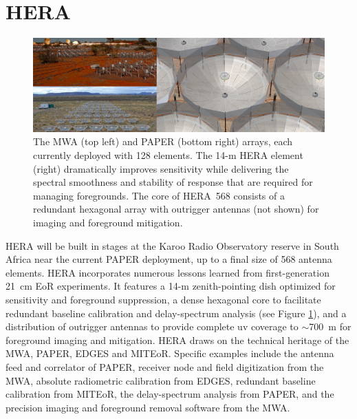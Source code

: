 \documentclass[preprint]{aastex}
\begin{document}
\vspace{-0.25in}
\section{HERA}
\label{PDsec}
\begin{figure}[t]\centering
\includegraphics[width=6.5in]{plots/PAPER_and_MWA_and_HERA.jpg}
\caption{\small
The MWA (top left) and PAPER (bottom right) arrays, each currently deployed with 128 elements.
The 14-m HERA element (right) dramatically improves sensitivity
while delivering the spectral smoothness and stability of response that
are required for managing foregrounds.
The core of HERA~568 consists of a redundant hexagonal array with
outrigger antennas (not shown) for imaging and foreground mitigation.
}
\label{HERAfig}
\end{figure}

HERA will be built in stages at the Karoo Radio Observatory reserve in South Africa near the
current PAPER deployment, up to a final size of 568 antenna elements.
HERA 
incorporates numerous lessons learned from first-generation 21~cm EoR experiments.
It features a 14-m zenith-pointing dish optimized for sensitivity and foreground suppression,
a dense hexagonal core to facilitate redundant baseline calibration and
delay-spectrum analysis (see Figure \ref{HERAfig}), and a distribution of outrigger antennas to provide
complete uv coverage to $\sim$700~m for foreground imaging and mitigation.
HERA draws on the technical heritage of the MWA, PAPER,
EDGES and MITEoR. Specific examples include the antenna feed and correlator of
PAPER, receiver node and field digitization from the MWA, absolute radiometric
calibration from EDGES, redundant baseline calibration from MITEoR, the
delay-spectrum analysis from PAPER, and the precision imaging and foreground
removal software from the MWA.

\end{document}
